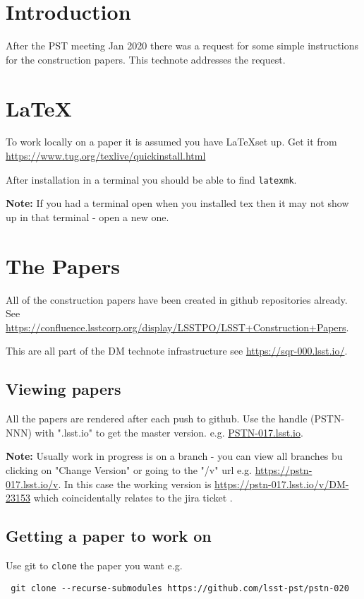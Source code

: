 \section{Introduction}
After the PST meeting Jan 2020 there was a request for some simple instructions for the construction papers.
This technote addresses the request.

\section{\LaTeX}
To work locally on a paper it is assumed you have \LaTeX set up.
Get it from \url{https://www.tug.org/texlive/quickinstall.html}

After installation in a terminal you should be able to find \texttt{latexmk}.

\textbf{Note:} If you had a terminal open when you installed tex then it may not show up in that terminal - open a new one.

\section{The Papers}

All of the construction papers have been created in github repositories already.
See \url{https://confluence.lsstcorp.org/display/LSSTPO/LSST+Construction+Papers}.

This are all part of the DM technote infrastructure see \url{https://sqr-000.lsst.io/}.

\subsection{Viewing papers}
All the papers are rendered after each push to github. Use the handle (PSTN-NNN) with ".lsst.io" to get the master
version. e.g. \url{PSTN-017.lsst.io}.

\textbf{Note:} Usually work in progress is on a branch - you can view all branches bu clicking on "Change Version" or going to the "/v" url e.g. \url{https://pstn-017.lsst.io/v}.  In this case the working version is \url{https://pstn-017.lsst.io/v/DM-23153} which coincidentally relates to the jira ticket .

\subsection{Getting a paper to work on}
Use git to \texttt{clone} the paper you want e.g.
\begin{verbatim}
 git clone --recurse-submodules https://github.com/lsst-pst/pstn-020
\end{verbatim}

